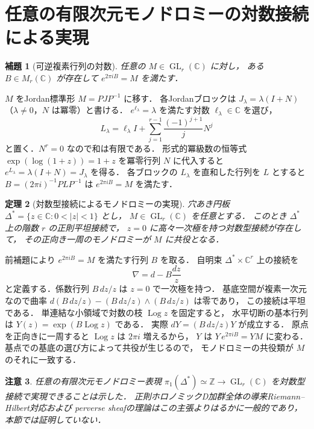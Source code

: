 \documentclass[a5paper,10pt,onecolumn]{jsarticle}
\makeatletter
\theoremstyle{mathnotetheorem}
\newtheorem{theorem}{定理}[section]
\newtheorem{lemma}[theorem]{補題}
\newtheorem{remark}[theorem]{注意}
\renewcommand{\proofname}{証明}
\renewenvironment{proof}[1][\proofname]{%
  \par\pushQED{\qed}\normalfont\topsep4\p@\@plus2\p@\relax
  \trivlist\item[\hskip\labelsep\bfseries #1]\ignorespaces
}{\popQED\endtrivlist\@endpefalse}
\makeatother
\begin{document}
\section{任意の有限次元モノドロミーの対数接続による実現}
\begin{lemma}[可逆複素行列の対数]
任意の $M\in\operatorname{GL}_r(\mathbb C)$ に対し，
ある $B\in M_r(\mathbb C)$ が存在して
$e^{2\pi iB}=M$ を満たす．
\end{lemma}
\begin{proof}
$M$ をJordan標準形 $M=PJP^{-1}$ に移す．
各Jordanブロックは $J_\lambda=\lambda(I+N)$
（$\lambda\ne0$，$N$ は冪零）と書ける．
$e^{\ell_\lambda}=\lambda$ を満たす対数
$\ell_\lambda\in\mathbb C$ を選び，
\[
 L_\lambda=\ell_\lambda I
 +\sum_{j=1}^{r-1}\frac{(-1)^{j+1}}jN^j
\]
と置く．$N^r=0$ なので和は有限である．
形式的冪級数の恒等式
$\exp(\log(1+z))=1+z$ を冪零行列 $N$ に代入すると
$e^{L_\lambda}=\lambda(I+N)=J_\lambda$ を得る．
各ブロックの $L_\lambda$ を直和した行列を $L$ とすると
$B=(2\pi i)^{-1}PLP^{-1}$ は $e^{2\pi iB}=M$ を満たす．
\end{proof}
\begin{theorem}[対数型接続によるモノドロミーの実現]
穴あき円板 $\Delta^*=\{z\in\mathbb C:0<|z|<1\}$ とし，
$M\in\operatorname{GL}_r(\mathbb C)$ を任意とする．
このとき $\Delta^*$ 上の階数 $r$ の正則平坦接続で，
$z=0$ に高々一次極を持つ対数型接続が存在して，
その正向き一周のモノドロミーが $M$ に共役となる．
\end{theorem}
\begin{proof}
前補題により $e^{2\pi iB}=M$ を満たす行列 $B$ を取る．
自明束 $\Delta^*\times\mathbb C^r$ 上の接続を
\[
 \nabla=d-B\frac{dz}{z}
\]
と定義する．係数行列 $B\,dz/z$ は $z=0$ で一次極を持つ．
基底空間が複素一次元なので曲率
$d(B\,dz/z)-(B\,dz/z)\wedge(B\,dz/z)$ は零であり，
この接続は平坦である．
単連結な小領域で対数の枝 $\operatorname{Log}z$ を固定すると，
水平切断の基本行列は
$Y(z)=\exp(B\operatorname{Log}z)$ である．
実際 $dY=(B\,dz/z)Y$ が成立する．
原点を正向きに一周すると
$\operatorname{Log}z$ は $2\pi i$ 増えるから，
$Y$ は $Y\,e^{2\pi iB}=YM$ に変わる．
基点での基底の選び方によって共役が生じるので，
モノドロミーの共役類が $M$ のそれに一致する．
\end{proof}
\begin{remark}
任意の有限次元モノドロミー表現
$\pi_1(\Delta^*)\simeq\mathbb Z\to\operatorname{GL}_r(\mathbb C)$
を対数型接続で実現できることは示した．
正則ホロノミックD加群全体の導来Riemann--Hilbert対応および
perverse sheafの理論はこの主張よりはるかに一般的であり，
本節では証明していない．
\end{remark}
\end{document}
